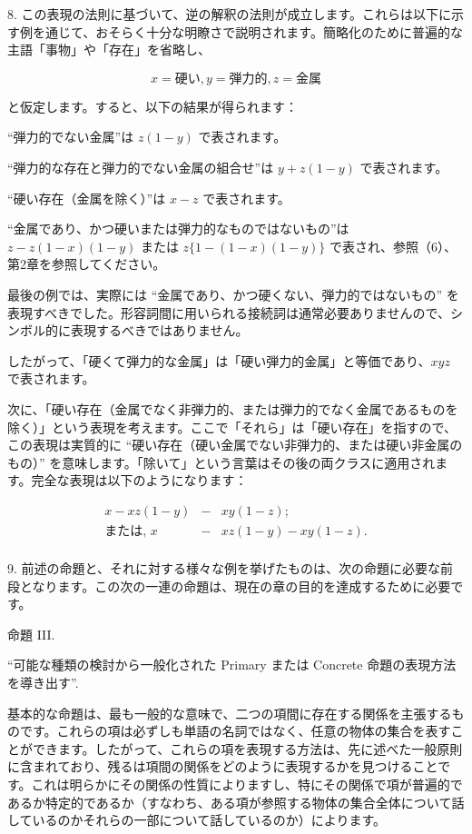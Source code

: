 \documentclass[a4paper,11pt,openany]{ltjsbook}
\begin{document}
8. この表現の法則に基づいて、逆の解釈の法則が成立します。これらは以下に示す例を通じて、おそらく十分な明瞭さで説明されます。簡略化のために普遍的な主語「事物」や「存在」を省略し、

\[
x = \text{硬い}, y = \text{弾力的}, z = \text{金属}
\]

と仮定します。すると、以下の結果が得られます：

``弾力的でない金属''は $z (1 - y)$ で表されます。

``弾力的な存在と弾力的でない金属の組合せ''は $y + z (1 - y)$ で表されます。

``硬い存在（金属を除く）''は $x - z$ で表されます。

``金属であり、かつ硬いまたは弾力的なものではないもの''は $z - z(1 - x)(1 - y)$ または $z \{1 - (1 - x) (1 - y)\}$ で表され、参照（6）、第2章を参照してください。

最後の例では、実際には ``金属であり、かつ硬くない、弾力的ではないもの'' を表現すべきでした。形容詞間に用いられる接続詞は通常必要ありませんので、シンボル的に表現するべきではありません。

したがって、「硬くて弾力的な金属」は「硬い弾力的金属」と等価であり、$xyz$ で表されます。

次に、「硬い存在（金属でなく非弾力的、または弾力的でなく金属であるものを除く）」という表現を考えます。ここで「それら」は「硬い存在」を指すので、この表現は実質的に ``硬い存在（硬い金属でない非弾力的、または硬い非金属のもの）'' を意味します。「除いて」という言葉はその後の両クラスに適用されます。完全な表現は以下のようになります：

\begin{eqnarray*}
x - xz (1 - y) &-& xy (1 - z);\\
\textrm{または, } x &-& xz (1 - y) - xy (1 - z).\\
\end{eqnarray*}

9. 前述の命題と、それに対する様々な例を挙げたものは、次の命題に必要な前段となります。この次の一連の命題は、現在の章の目的を達成するために必要です。

\textsc{命題 III}.

``可能な種類の検討から一般化された Primary または Concrete 命題の表現方法を導き出す''.

基本的な命題は、最も一般的な意味で、二つの項間に存在する関係を主張するものです。これらの項は必ずしも単語の名詞ではなく、任意の物体の集合を表すことができます。したがって、これらの項を表現する方法は、先に述べた一般原則に含まれており、残るは項間の関係をどのように表現するかを見つけることです。これは明らかにその関係の性質によりますし、特にその関係で項が普遍的であるか特定的であるか（すなわち、ある項が参照する物体の集合全体について話しているのかそれらの一部について話しているのか）によります。
\end{document}
